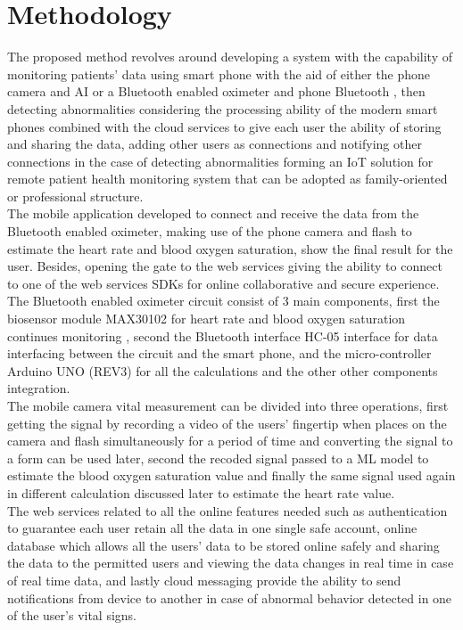 \documentclass{bmcart}
\begin{document}
\section*{Methodology}
The proposed method revolves around developing a system with the capability of
monitoring patients' data using smart phone with the aid of either the phone
camera and AI or a Bluetooth enabled oximeter and phone Bluetooth , then
detecting abnormalities considering the processing ability of the modern smart
phones combined with the cloud services to give each user the ability of storing
and sharing the data, adding other users as connections and notifying other
connections in the case of detecting abnormalities forming an IoT solution for
remote patient health monitoring system that can be adopted as family-oriented
or professional structure.\\
The mobile application developed to connect and receive the data from the
Bluetooth enabled oximeter, making use of the phone camera and flash to estimate
the heart rate and blood oxygen saturation, show the final result for the user.
Besides, opening the gate to the web services giving the ability to connect to
one of the web services SDKs for online collaborative and secure experience.\\
The Bluetooth enabled oximeter circuit consist of 3 main components, first the
biosensor module MAX30102 for heart rate and blood oxygen saturation continues
monitoring \cite{max30102}, second the Bluetooth interface HC-05 interface for
data interfacing between the circuit and the smart phone, and the
micro-controller Arduino UNO (REV3) for all the calculations and the other other
components integration.\\
The mobile camera vital measurement can be divided into three operations, first
getting the signal by recording a video of the users' fingertip when places on
the camera and flash simultaneously for a period of time and converting the
signal to a form can be used later, second the recoded signal passed to a ML
model to estimate the blood oxygen saturation value and finally the same signal
used again in different calculation discussed later to estimate the heart rate
value.\\
The web services related to all the online features needed such as
authentication to  guarantee each user retain all the data in one single safe
account, online database which allows all the users' data to be stored online
safely and sharing the data to the permitted users and viewing the data changes
in real time in case of real time data, and  lastly cloud messaging provide the
ability to send notifications from device to another in case of abnormal
behavior detected in one of the user's vital signs.\\
\end{document}
